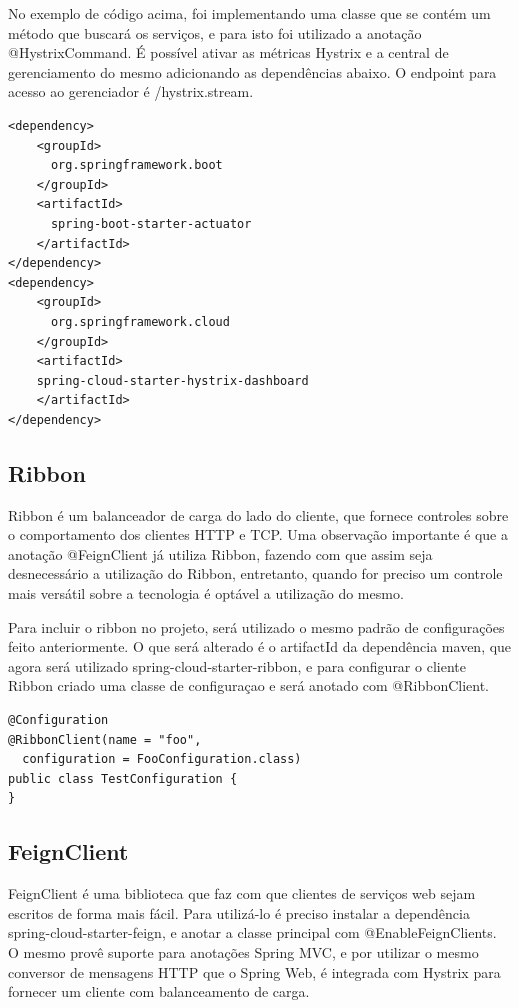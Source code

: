\documentclass[journal]{IEEEtran}
\begin{document}
No exemplo de código acima, foi implementando uma classe que se contém um método que buscará os serviços, e para isto foi utilizado a anotação @HystrixCommand. É possível ativar as métricas Hystrix e a central de gerenciamento do mesmo adicionando as dependências abaixo. O endpoint para acesso ao gerenciador é /hystrix.stream.

\begin{verbatim}
<dependency>
    <groupId>
      org.springframework.boot
    </groupId>
    <artifactId>
      spring-boot-starter-actuator
    </artifactId>
</dependency>
<dependency>
    <groupId>
      org.springframework.cloud
    </groupId>
    <artifactId>
    spring-cloud-starter-hystrix-dashboard
    </artifactId>
</dependency>
\end{verbatim}

\subsection{Ribbon}

Ribbon é um  balanceador de carga do lado do cliente, que fornece controles sobre o comportamento dos clientes HTTP e TCP. Uma observação importante é que a anotação @FeignClient já utiliza Ribbon, fazendo com que assim seja desnecessário a utilização do Ribbon, entretanto, quando for preciso um controle mais versátil sobre a tecnologia é optável a utilização do mesmo.

Para incluir o ribbon no projeto, será utilizado o mesmo padrão de configurações feito anteriormente. O que será alterado é o artifactId da dependência maven, que agora será utilizado spring-cloud-starter-ribbon, e para configurar o cliente Ribbon criado uma classe de configuraçao e será anotado com @RibbonClient. 

\begin{verbatim}
@Configuration
@RibbonClient(name = "foo", 
  configuration = FooConfiguration.class)
public class TestConfiguration {
}
\end{verbatim}

\subsection{FeignClient}

FeignClient é uma biblioteca que faz com que clientes de serviços web sejam escritos de forma mais fácil. Para utilizá-lo é preciso instalar a dependência spring-cloud-starter-feign, e anotar a classe principal com @EnableFeignClients. O mesmo provê suporte para anotações Spring MVC, e por utilizar o mesmo conversor de mensagens HTTP que o Spring Web, é integrada com Hystrix para fornecer um cliente com balanceamento de carga.
\end{document}
